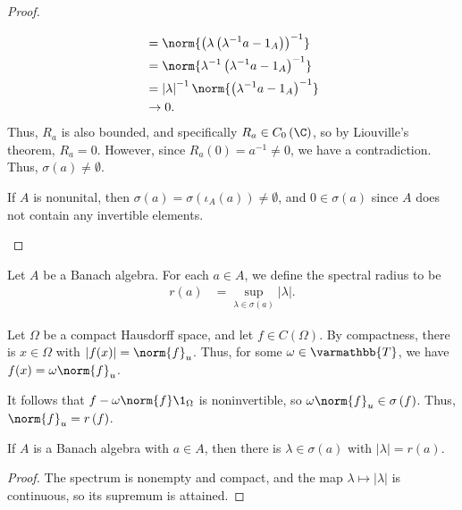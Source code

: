 \documentclass[10pt]{mypackage}
\renewcommand*{\mathbb}[1]{\varmathbb{#1}}
\begin{document}
\begin{proof}
\begin{enumerate}[(1)]
\begin{align*}
                                       &= \norm{\left(\lambda\left(\lambda^{-1}a - 1_A\right)\right)^{-1}}\\
                                       &= \norm{\lambda^{-1}\left(\lambda^{-1}a - 1_A\right)^{-1}}\\
                                       &= \left\vert \lambda \right\vert^{-1}\norm{\left(\lambda^{-1}a - 1_A\right)^{-1}}\\
                                       &\rightarrow 0.
      \end{align*}
      Thus, $R_a$ is also bounded, and specifically $R_a\in C_0\left(\C\right)$, so by Liouville's theorem, $R_a = 0$. However, since $R_a\left(0\right) = a^{-1}\neq 0$, we have a contradiction. Thus, $\sigma\left(a\right) \neq \emptyset$.\newline

      If $A$ is nonunital, then $\sigma\left(a\right) = \sigma\left(\iota_A\left(a\right)\right) \neq \emptyset$, and $0\in \sigma\left(a\right)$ since $A$ does not contain any invertible elements.
  \end{enumerate}
\end{proof}
\begin{definition}
  Let $A$ be a Banach algebra. For each $a\in A$, we define the spectral radius to be
  \begin{align*}
    r\left(a\right) &= \sup_{\lambda\in\sigma\left(a\right)}\left\vert \lambda \right\vert.
  \end{align*}
\end{definition}
\begin{example}
  Let $\Omega$ be a compact Hausdorff space, and let $f\in C\left(\Omega\right)$. By compactness, there is $x\in \Omega$ with $\left\vert f(x) \right\vert = \norm{f}_{u}$. Thus, for some $\omega\in \mathbb{T}$, we have $f(x) = \omega\norm{f}_u$.\newline

  It follows that $f - \omega \norm{f}\1_{\Omega}$ is noninvertible, so $\omega \norm{f}_u\in \sigma\left(f\right)$. Thus, $\norm{f}_u = r\left(f\right)$.
\end{example}
\begin{corollary}
  If $A$ is a Banach algebra with $a\in A$, then there is $\lambda\in \sigma\left(a\right)$ with $\left\vert \lambda \right\vert = r(a)$.
\end{corollary}
\begin{proof}
  The spectrum is nonempty and compact, and the map $\lambda\mapsto \left\vert \lambda \right\vert$ is continuous, so its supremum is attained.
\end{proof}
\end{document}
